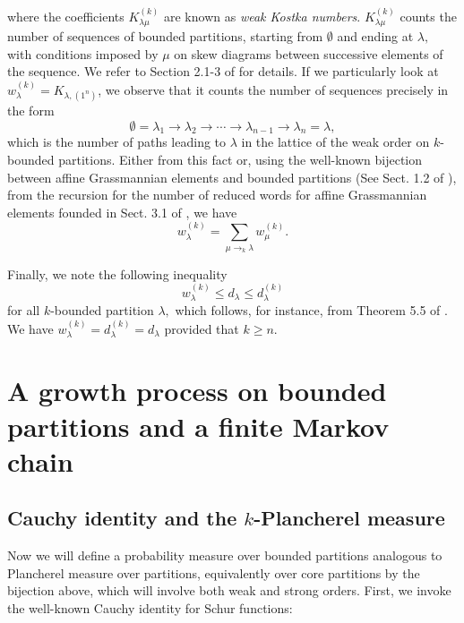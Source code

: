 \documentclass[11pt]{amsart}
\begin{document}
where the coefficients $K_{\lambda \mu}^{(k)}$ are known as \textit{weak Kostka numbers}. $K_{\lambda \mu}^{(k)}$ counts the number of sequences of bounded partitions, starting from $\emptyset$ and ending at $\lambda,$ with conditions imposed by $\mu$ on skew diagrams between successive elements of the sequence. We refer to Section 2.1-3 of \cite{LLMSSZ14} for details. If we particularly look at $w_{\lambda}^{(k)}=K_{\lambda,(1^n)}$, we observe that it counts the number of sequences precisely in the form
\[\emptyset = \lambda_1 \rightarrow \lambda_2 \rightarrow \cdots \rightarrow \lambda_{n-1} \rightarrow \lambda_n =\lambda,\]
which is the number of paths leading to $\lambda$ in the lattice of the weak order on $k$-bounded partitions. Either from this fact or, using the well-known bijection between affine Grassmannian elements and bounded partitions (See Sect. 1.2 of \cite{LLMSSZ14}), from the recursion for the number of reduced words for affine Grassmannian elements founded in Sect. 3.1 of \cite{BB05}, we have
\begin{equation}\label{w_kostka}
    w_{\lambda}^{(k)}= \sum_{\mu \to_k \lambda} w_{\mu}^{(k)}. 
\end{equation}


Finally, we note the following inequality 
\[w_{\lambda}^{(k)} \leq d_{\lambda} \leq d_{\lambda}^{(k)}\]
for all $k$-bounded partition $\lambda,$ which follows, for instance, from Theorem 5.5 of \cite{BB96}. We have 
$w_{\lambda}^{(k)} = d_{\lambda}^{(k)}=d_{\lambda}$
provided that $k\geq n.$

\section{A growth process on bounded partitions and a finite Markov chain}

\subsection{Cauchy identity and the $k$-Plancherel measure}\label{sec:k-Planch}

Now we will define a probability measure over bounded partitions analogous to Plancherel measure over partitions, equivalently over core partitions by the bijection above, which will involve both weak and strong orders. First, we invoke the well-known Cauchy identity for Schur functions:
\end{document}
